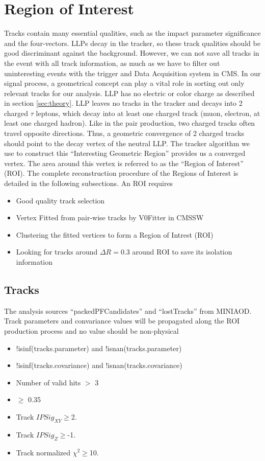 \section{Region of Interest}\label{sec:ROIs}
Tracks contain many essential qualities, such as the impact parameter significance and the four-vectors.
LLPs decay in the tracker, so these track qualities should be good discriminant against the background.
However, we can not save all tracks in the event with all track information, as much as we have to filter out uninteresting events with the trigger and Data Acquisition system in CMS.
In our signal process, a geometrical concept can play a vital role in sorting out only relevant tracks for our analysis.
LLP has no electric or color charge as described in section \ref{sec:theory}.
LLP leaves no tracks in the tracker and decays into 2 charged $\tau$ leptons, which decay into at least one charged track (muon, electron, at least one charged hadron).
Like in the pair production, two charged tracks often travel opposite directions.
Thus, a geometric convergence of 2 charged tracks should point to the decay vertex of the neutral LLP.
The tracker algorithm we use to construct this ``Interesting Geometric Region'' provides us a converged vertex.
The area around this vertex is referred to as the ``Region of Interest'' (ROI).
The complete reconstruction procedure of the Regions of Interest is detailed in the following subsections.
An ROI requires
\begin{itemize}
  \item Good quality track selection
  \item Vertex Fitted from pair-wise tracks by V0Fitter in CMSSW
  \item Clustering the fitted vertices to form a Region of Intrest (ROI)
  \item Looking for tracks around $\Delta R=0.3$ around ROI to save its isolation information
\end{itemize}

\subsection{Tracks}\label{sec:ROI_tracks}

The analysis sources ``packedPFCandidates'' and ``lostTracks'' from MINIAOD.
Track parameters and convariance values will be propagated along the ROI production process and no value should be non-physical
\begin{itemize}
  \item !isinf(tracks.parameter)  and !isnan(tracks.parameter) 
  \item !isinf(tracks.covariance) and !isnan(tracks.covariance) 
  \item Number of valid hits $>$ 3
  \item \pt $\geq$ 0.35
  \item Track $IPSig_{XY}\geq$2.
  \item Track $IPSig_{Z}\geq$-1.
  \item Track normalized $\chi^{2}\geq$10.
\end{itemize}


